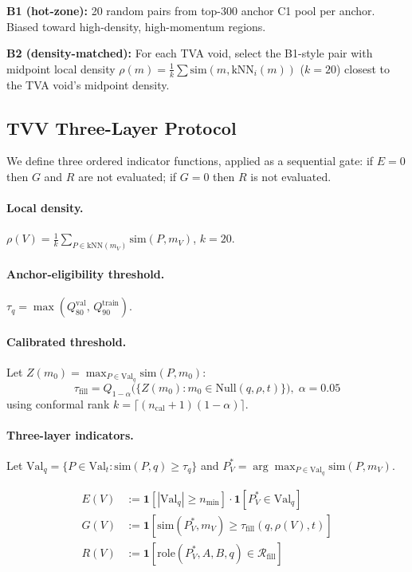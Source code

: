 \documentclass[11pt,twocolumn]{article}
\newcommand{\tva}{\textsf{TVA}}
\newcommand{\valq}{\mathrm{Val}_{q}}
\newcommand{\taufill}{\tau_{\mathrm{fill}}}
\newcommand{\tauanchor}{\tau_{q}}
\begin{document}
\textbf{B1 (hot-zone):} 20 random pairs from top-300 anchor C1 pool per anchor.
Biased toward high-density, high-momentum regions.

\textbf{B2 (density-matched):} For each \tva{} void, select the B1-style pair with
midpoint local density $\rho(m) = \frac{1}{k}\sum \mathrm{sim}(m, \mathrm{kNN}_i(m))$
($k=20$) closest to the \tva{} void's midpoint density.

\subsection{TVV Three-Layer Protocol}

We define three ordered indicator functions, applied as a sequential gate:
if $E=0$ then $G$ and $R$ are not evaluated; if $G=0$ then $R$ is not evaluated.

\paragraph{Local density.}
$\rho(V) = \frac{1}{k}\sum_{P \in \mathrm{kNN}(m_V)} \mathrm{sim}(P,m_V)$, $k{=}20$.

\paragraph{Anchor-eligibility threshold.}
$\tauanchor = \max(Q_{80}^{\mathrm{val}},\, Q_{90}^{\mathrm{train}})$.

\paragraph{Calibrated threshold.} Let $Z(m_0)=\max_{P\in\valq}\mathrm{sim}(P,m_0)$:
\[
\taufill = Q_{1-\alpha}\bigl(\{Z(m_0): m_0{\in}\mathrm{Null}(q,\rho,t)\}\bigr),\;\alpha{=}0.05
\]
using conformal rank $k{=}\lceil(n_\mathrm{cal}{+}1)(1{-}\alpha)\rceil$.

\paragraph{Three-layer indicators.}
Let $\valq = \{P \in \mathrm{Val}_t : \mathrm{sim}(P,q) \ge \tauanchor\}$ and
$P_V^* = \arg\max_{P \in \valq} \mathrm{sim}(P, m_V)$.

\begin{align}
E(V) &:= \mathbf{1}[|\valq| \ge n_{\min}]\cdot\mathbf{1}[P_V^* \in \valq]
         \tag{E} \\
G(V) &:= \mathbf{1}[\mathrm{sim}(P_V^*, m_V) \ge \taufill(q,\rho(V),t)]
         \tag{G} \\
R(V) &:= \mathbf{1}[\mathrm{role}(P_V^*,A,B,q) \in \mathcal{R}_\mathrm{fill}]
         \tag{R}
\end{align}
\end{document}
